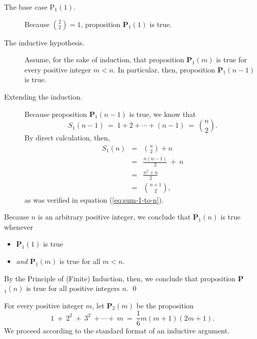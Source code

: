 \begin{description}
\item[{\small\sf The base case P$_1(1)$}.]
%
Because ${\displaystyle {2 \choose 2}} = 1$, proposition {\bf P}$_1(1)$
is true.

\item[{\small\sf The inductive hypothesis}.]
%
Assume, for the sake of induction, that proposition {\bf P}$_1(m)$ is
true for every positive integer $m < n$.  In particular, then,
proposition {\bf P}$_1(n-1)$ is true.

\item[{\small\sf Extending the induction}.]
%
Because proposition {\bf P}$_1(n-1)$ is true, we know that
\[ S_1(n-1) \ = \ 1 + 2 + \cdots + (n-1) \ = \ {n \choose 2}.  \]
By direct calculation, then,
\begin{eqnarray*}
S_1(n) & = & {n \choose 2} + n \\
  & = & \frac{n(n-1)}{2}  \ + \ n \\ 
  & = & \frac{n^2 + n}{2} \\
  & = & {{n+1} \choose 2},
\end{eqnarray*}
as was verified in equation (\ref{eq:sum-1-to-n}).
\end{description}
Because $n$ is an arbitrary positive integer, we conclude that
{\bf P}$_1(n)$ is true whenever
\begin{itemize}
\item
{\bf P}$_1(1)$ is true
\item
{\em and}
{\bf P}$_1(m)$ is true for all $m < n$.
\end{itemize}
By the Principle of (Finite) Induction, then, we conclude that
proposition {\bf P}$_1(n)$ is true for all positive integers $n$.
\qed

\bigskip


%
For every positive integer $m$, let {\bf P}$_2(m)$ be the proposition
\[  1 \ + \ 2^2 \ + \ 3^2 \ + \cdots + \ m \ = \ 
\frac{1}{6} m (m+1)(2m+1).
\]
We proceed according to the standard format of an inductive argument.

